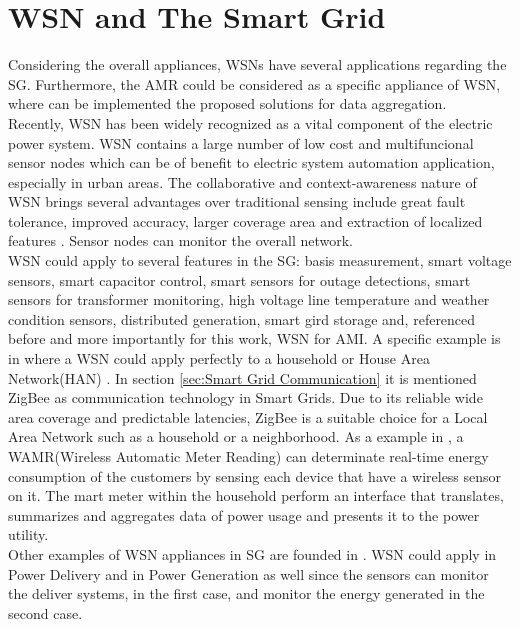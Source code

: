\section{WSN and  The Smart Grid}
Considering the overall appliances, WSNs have several applications regarding the SG. Furthermore, the AMR could be considered as a specific appliance of WSN, where can be implemented the proposed solutions for data aggregation.\\
Recently, WSN has been widely  recognized as a vital component of the electric power system\cite{journals/ijdsn/Liu12}. WSN contains a large number of low cost and multifuncional sensor nodes which can be of benefit to electric system automation application, especially in urban areas\cite{RePEc:eee:rensus:v:15:y:2011:i:6:p:2736-2742}. The collaborative and context-awareness nature of WSN brings several advantages over traditional sensing include great fault tolerance, improved accuracy, larger coverage area and extraction of localized features \cite{journals/ijdsn/Liu12}. Sensor nodes can monitor the overall network.\\
WSN could apply to several features in the SG: basis measurement, smart voltage sensors, smart capacitor control, smart sensors for outage detections, smart sensors for transformer monitoring, high voltage line temperature and weather condition sensors, distributed generation, smart gird storage and, referenced before and more importantly for this work, WSN for AMI.
A specific example is in \cite{journals/ijdsn/Liu12} where a WSN could apply perfectly to a household or House Area Network(HAN) . In section \ref{sec:Smart Grid Communication} it is mentioned ZigBee as communication technology in Smart Grids. Due to its reliable wide area coverage and predictable latencies, ZigBee is a suitable choice for a Local Area Network such as a household or a neighborhood. As a example in \cite{journals/ijdsn/Liu12}, a WAMR(Wireless Automatic Meter Reading) can determinate real-time energy consumption of the customers by sensing each device that have a wireless sensor on it. The mart meter within the household perform an interface that translates, summarizes and aggregates data of power usage and presents it to the power utility.\\ 
Other examples of WSN appliances in SG are founded in \cite{journals/ijdsn/Liu12}. WSN could apply in Power Delivery and in Power Generation as well since the sensors can monitor the deliver systems, in the first case, and monitor the energy generated in the second case.\\

